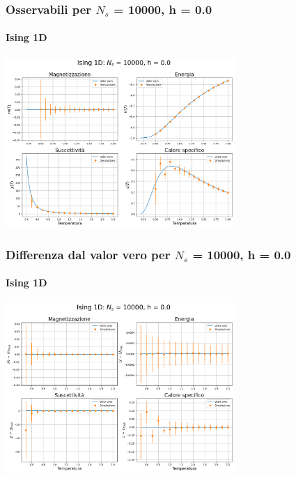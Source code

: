 \begin{frame}
    \frametitle{Osservabili per $N_s$ = 10000, h = 0.0}
    \framesubtitle{Ising 1D}

    \centering
    \includegraphics[width=0.65\textwidth]{Immagini/backupIsing1D/obs_10000_0.0.png}

\end{frame}



\begin{frame}
    \frametitle{Differenza dal valor vero per $N_s$ = 10000, h = 0.0}
    \framesubtitle{Ising 1D}

    \centering
    \includegraphics[width=0.65\textwidth]{Immagini/backupIsing1D/obs_10000_0.0_diff.png}

\end{frame}



